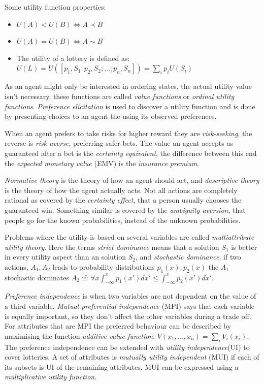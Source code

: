 \documentclass[11pt, letterpaper]{report}
\numberwithin{equation}{section}
\begin{document}
Some utility function properties:
\begin{itemize}
\item $U(A) < U(B) \iff A \prec B$
\item $U(A) = U(B) \iff A \sim B$
\item The utility of a lottery is defined as: \\
  $ U(L) = U([p_1,S_1;p_2,S_2;...;p_n,S_n]) = \sum_i p_iU(S_i)$
\end{itemize}
As an agent might only be interested in ordering states, the actual utility
value isn't necessary, these functions are called \emph{value functions} or
\emph{ordinal utility functions}. \emph{Preference elicitation} is used to
discover a utility function and is done by presenting choices to an agent the
using its observed preferences.

When an agent prefers to take risks for higher reward they are
\emph{risk-seeking}, the reverse is \emph{risk-averse}, preferring safer bets.
The value an agent accepts as guaranteed after a bet is the \emph{certainty
  equivalent}, the difference between this end the \emph{ expected monetary value }(EMV)
is the \emph{insurance premium}.

\emph{Normative theory} is the theory of how an agent should act, and
\emph{descriptive theory} is the theory of how the agent actually acts. Not all
actions are completely rational as covered by the \emph{certainty effect}, that
a person usually chooses the guaranteed win. Something similar is covered by the
\emph{ambiguity aversion}, that people go for the known probabilities, instead
of the unknown probabilities.

Problems where the utility is based on several variables are called
\emph{multiattribute utility theory}. Here the terms \emph{strict dominance}
means that a solution $S_1$ is better in every utility aspect than an solution
$S_2$, and \emph{stochastic dominance}, if two actions, $A_1, A_2$ leads to probability
distributions $p_1(x),p_2(x)$ the $A_1$ stochastic dominates $A_2$ if:
$\forall x \int_{-\infty}^x p_1(x')dx' \leq \int_{-\infty}^x p_2(x')dx'$.

\emph{Preference independence} is when two variables are not dependent on the
value of a third variable. \emph{Mutual preferential independence} (MPI) says
that each variable is equally important, so they don't affect the other
variables during a trade off. For attributes that are MPI the preferred
behaviour can be described by maximising the function \emph{additive value function},
$V(x_1,...,x_n) = \sum_i V_i(x_i)$. The preference independence can be extended
with \emph{utility independence}(UI) to cover lotteries. A set of attributes is
\emph{mutually utility independent} (MUI) if each of its subsets is UI of the
remaining attributes. MUI can be expressed using a \emph{multiplicative utility function}.
\end{document}
